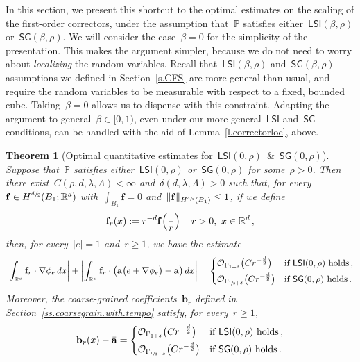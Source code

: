\documentclass[11pt]{article} %
\numberwithin{equation}{section}
\newtheorem{theorem}{Theorem}[section]
\theoremstyle{definition}
\let\originalleft\left
\let\originalright\right
\renewcommand{\left}{\mathopen{}\mathclose\bgroup\originalleft}
\renewcommand{\right}{\aftergroup\egroup\originalright}
\newcommand*{\Rd}{\ensuremath{\mathbb{R}^d}}
\renewcommand{\b}{\ensuremath{\mathbf{b}}}
\newcommand{\f}{\mathbf{f}}
\renewcommand{\a}{\mathbf{a}}
\newcommand{\ahom}{\bar{\a}}
\renewcommand{\P}{\mathbb{P}}
\renewcommand{\O}{\mathcal{O}}
\newcommand{\LSI}{\mathsf{LSI}}
\newcommand{\SG}{\mathsf{SG}}
\begin{document}
In this section, we present this shortcut to the optimal estimates on the scaling of the first-order correctors, under the assumption that~$\P$ satisfies either~$\LSI(\beta,\rho)$ or~$\SG(\beta,\rho)$. We will consider the case~$\beta = 0$ for the simplicity of the presentation. This makes the argument simpler, because we do not need to worry about \emph{localizing} the random variables. Recall that~$\LSI(\beta,\rho)$ and~$\SG(\beta,\rho)$ assumptions we defined in Section~\ref{s.CFS} are more general than usual, and require the random variables to be measurable with respect to a fixed, bounded cube. Taking~$\beta = 0$ allows us to dispense with this constraint. Adapting the argument to general~$\beta \in [0,1)$, even under our more general~$\LSI$ and~$\SG$ conditions, can be handled with the aid of Lemma~\ref{l.correctorloc}, above. 

\smallskip


\begin{theorem}[{Optimal quantitative estimates for~$\LSI(0,\rho)$~\&~$\SG(0,\rho)$}]
\label{t.wecan.do.SG.too}
Suppose that~$\P$ satisfies either~$\LSI(0,\rho)$ or~$\SG(0,\rho)$ for some~$\rho>0$. 
Then there exist~$C(\rho, d,\lambda,\Lambda)<\infty$ and~$\delta(d,\lambda,\Lambda)>0$ such that, for every~$\f \in H^{\sfrac d2}(B_1;\Rd)$ with~$\int_{B_1}\f =0$ and~$\| \f \|_{H^{\sfrac d2}(B_1)} \leq 1$, if we define 
\begin{equation*}
\f_r(x) := r^{-d} \f\Bigl( \frac\cdot r\Bigr)\,\quad r>0,\ x\in\Rd\,,
\end{equation*}
then, for every~$|e|=1$ and~$r\geq 1$, we have the estimate
\begin{equation}
\label{e.cheating}
\biggl| \int_{\Rd} 
\f_r \cdot \nabla \phi_e \,dx\biggr|
+
\biggl| \int_{\Rd} 
\f_r  \cdot \bigl( \a  \bigl( e+ \nabla \phi_e\bigr) - \ahom\bigr) \,dx\biggr|
= 
\left\{
\begin{aligned}
& \O_{\Gamma_{1+\delta}} \bigl(C r^{-\frac d2} \bigr) & \mbox{if} & \ \LSI(0,\rho) \ \mbox{holds}\,, \\
& \O_{\Gamma_{\sfrac13+\delta}} \bigl(C r^{-\frac d2} \bigr) & \mbox{if} & \ \SG(0,\rho)\ \mbox{holds}\,.
\end{aligned}
\right.
\end{equation}
Moreover, the coarse-grained coefficients~$\b_r$ defined in Section~\ref{ss.coarsegrain.with.tempo} satisfy, for every~$r\geq 1$,
\begin{equation}
\label{e.cheating.CG}
\b_r(x) - \ahom  
= 
\left\{
\begin{aligned}
& \O_{\Gamma_{1+\delta}} \bigl(C r^{-\frac d2} \bigr) & \mbox{if} & \ \LSI(0,\rho) \ \mbox{holds}\,, \\
& \O_{\Gamma_{\sfrac13+\delta}} \bigl(C r^{-\frac d2} \bigr) & \mbox{if} & \ \SG(0,\rho)\ \mbox{holds}\,.
\end{aligned}
\right.
\end{equation}
\end{theorem}
\end{document}
